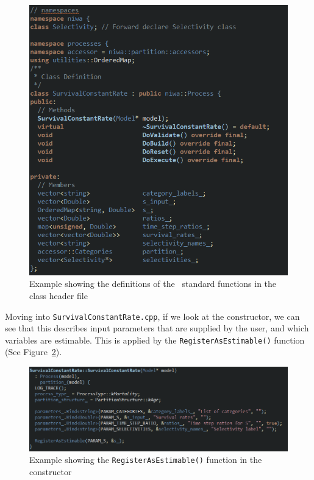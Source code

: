 \begin{figure}[H]
	\centering
	\includegraphics[scale=0.6]{Figures/process_h.png}
	\caption{Example showing the definitions of the \CNAME\ standard functions in the class header file}\label{fig:process_h}
\end{figure}

Moving into \texttt{SurvivalConstantRate.cpp}, if we look at the constructor, we can see that this describes input parameters that are supplied by the user, and which variables are estimable. This is applied by the \texttt{RegisterAsEstimable()} function (See Figure~\ref{fig:constructor}).

\begin{figure}[H]
	\centering
	\includegraphics[scale=0.6]{Figures/constructor.png}
	\caption{Example showing the \texttt{RegisterAsEstimable()} function in the constructor}\label{fig:constructor}
\end{figure}

